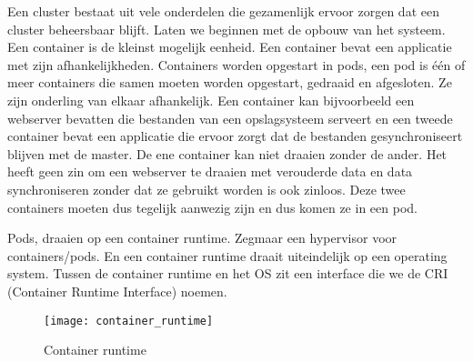 Een cluster bestaat uit vele onderdelen die gezamenlijk ervoor zorgen dat een cluster beheersbaar blijft. Laten we beginnen met de opbouw van het systeem. Een container is de kleinst mogelijk eenheid. Een container bevat een applicatie met zijn afhankelijkheden. Containers worden opgestart in pods, een pod is \'e\'en of meer containers die samen moeten worden opgestart, gedraaid en afgesloten. Ze zijn onderling van elkaar afhankelijk. Een container kan bijvoorbeeld een webserver bevatten die bestanden van een opslagsysteem serveert en een tweede container bevat een applicatie die ervoor zorgt dat de bestanden gesynchroniseert blijven met de master. De ene container kan niet draaien zonder de ander. Het heeft geen zin om een webserver te draaien met verouderde data en data synchroniseren zonder dat ze gebruikt worden is ook zinloos. Deze twee containers moeten dus tegelijk aanwezig zijn en dus komen ze in een pod.

Pods, draaien op een container runtime. Zegmaar een hypervisor voor containers/pods. En een container runtime draait uiteindelijk op een operating system. Tussen de container runtime en het OS zit een interface die we de CRI (Container Runtime Interface) noemen.

\begin{figure}[H]
\texttt{[image: container\_runtime]}
	\caption{Container runtime}
	\label{ref:container_runtime}
\end{figure}
